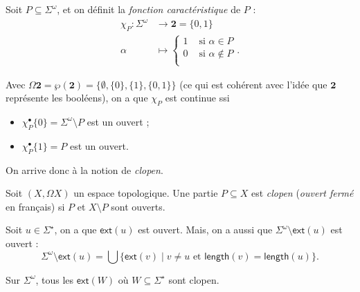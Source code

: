 \documentclass[./main]{subfiles}
\begin{document}
  Soit $P \subseteq \Sigma^\omega$, et on définit la \textit{fonction caractéristique} de $P$ :
  \begin{align*}
    \chi_P: \Sigma^\omega &\longrightarrow \mathbf{2} = \{0,1\} \\
    \alpha &\longmapsto \begin{cases}
      1 & \text{ si } \alpha \in P\\
      0 & \text{ si } \alpha \not\in P\\
    \end{cases}
  .\end{align*}

  Avec $\Omega \mathbf{2} = \wp(\mathbf{2}) = \{\emptyset, \{0\} , \{1\} , \{0,1\}\}$ (ce qui est cohérent avec l'idée que $\mathbf{2}$ représente les booléens), on a que $\chi_P$ est continue ssi 
  \begin{itemize}
    \item $\chi_P^\bullet \{0\} = \Sigma^\omega \setminus P$ est un ouvert ;
    \item $\chi_P^\bullet \{1\} = P $ est un ouvert.
  \end{itemize}
  On arrive donc à la notion de \textit{clopen}.

  \begin{defn}
    Soit $(X, \Omega X)$ un espace topologique.
    Une partie $P \subseteq X$ est \textit{clopen} (\textit{ouvert fermé} en français) si $P$ et $X \setminus P$ sont ouverts.
  \end{defn}

  \begin{exm}
    Soit $u \in \Sigma^\star$, on a que $\mathsf{ext}(u)$ est ouvert.
    Mais, on a aussi que $\Sigma^\omega \setminus \mathsf{ext}(u)$ est ouvert :
    \[
    \Sigma^\omega \setminus \mathsf{ext}(u) = \bigcup \{ \mathsf{ext}(v)  \mid v \neq u \text{ et } \mathsf{length}(v) = \mathsf{length}(u) \}
    .\]
  \end{exm}

  \begin{rmk}
    Sur $\Sigma^\omega$, tous les $\mathsf{ext}(W)$ où $W \subseteq \Sigma^\star$ sont clopen.
  \end{rmk}
\end{document}
